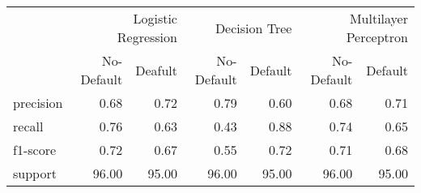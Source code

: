 \begin{table}
\thcenter
\begin{tabular}{lrrrrrr}
 & \multicolumn{2}{r}{Logistic Regression} & \multicolumn{2}{r}{Decision Tree  } & \multicolumn{2}{r}{Multilayer Perceptron} \\
 & No-Default & Deafult & No-Default & Default & No-Default & Default \\
precision & 0.68 & 0.72 & 0.79 & 0.60 & 0.68 & 0.71 \\
recall & 0.76 & 0.63 & 0.43 & 0.88 & 0.74 & 0.65 \\
f1-score & 0.72 & 0.67 & 0.55 & 0.72 & 0.71 & 0.68 \\
support & 96.00 & 95.00 & 96.00 & 95.00 & 96.00 & 95.00 \\
\end{tabular}
\end{table}

